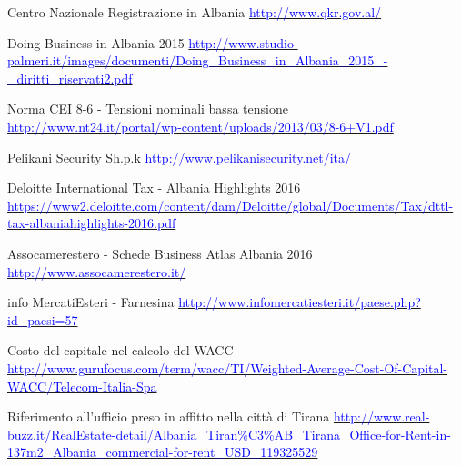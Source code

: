 \begin{thebibliography}{99}
	 Centro Nazionale Registrazione in Albania\newline 
			\href{http://www.qkr.gov.al/}{\textcolor{blue}{http://www.qkr.gov.al/}}

	 Doing Business in Albania 2015\newline 
			\href{http://www.studio-palmeri.it/images/documenti/Doing\_Business\_in\_Albania\_2015\_-\_diritti\_riservati2.pdf}{\textcolor{blue}{http://www.studio-palmeri.it/images/documenti/Doing\_Business\_in\_Albania\_2015\_-\_diritti\_riservati2.pdf}}

	 Norma CEI 8-6 - Tensioni nominali bassa tensione\newline 
			\href{http://www.nt24.it/portal/wp-content/uploads/2013/03/8-6+V1.pdf}{\textcolor{blue}{http://www.nt24.it/portal/wp-content/uploads/2013/03/8-6+V1.pdf}}
	
	 Pelikani Security Sh.p.k\newline 
			\href{http://www.pelikanisecurity.net/ita/}{\textcolor{blue}{http://www.pelikanisecurity.net/ita/}}

	 Deloitte International Tax - Albania Highlights 2016 \newline 
			\href{https://www2.deloitte.com/content/dam/Deloitte/global/Documents/Tax/dttl-tax-albaniahighlights-2016.pdf}{\textcolor{blue}{https://www2.deloitte.com/content/dam/Deloitte/global/Documents/Tax/dttl-tax-albaniahighlights-2016.pdf}}

	 Assocamerestero - Schede Business Atlas Albania 2016 \newline 
			\href{http://www.assocamerestero.it/}{\textcolor{blue}{http://www.assocamerestero.it/}}	

	 info MercatiEsteri - Farnesina \newline 
			\href{http://www.infomercatiesteri.it/paese.php?id\_paesi=57}{\textcolor{blue}{http://www.infomercatiesteri.it/paese.php?id\_paesi=57	}}
	
	 Costo del capitale nel calcolo del \ac{WACC} \newline 
			\href{http://www.gurufocus.com/term/wacc/TI/Weighted-Average-Cost-Of-Capital-WACC/Telecom-Italia-Spa}{\textcolor{blue}{http://www.gurufocus.com/term/wacc/TI/Weighted-Average-Cost-Of-Capital-WACC/Telecom-Italia-Spa}}

 Riferimento all'ufficio preso in affitto nella città di Tirana\newline 
			\href{http://www.real-buzz.it/RealEstate-detail/Albania\_Tiran\%C3\%AB\_Tirana\_Office-for-Rent-in-137m2\_Albania\_commercial-for-rent\_USD\_119325529}{\textcolor{blue}{http://www.real-buzz.it/RealEstate-detail/Albania\_Tiran\%C3\%AB\_Tirana\_Office-for-Rent-in-137m2\_Albania\_commercial-for-rent\_USD\_119325529}}		
	

\end{thebibliography}
